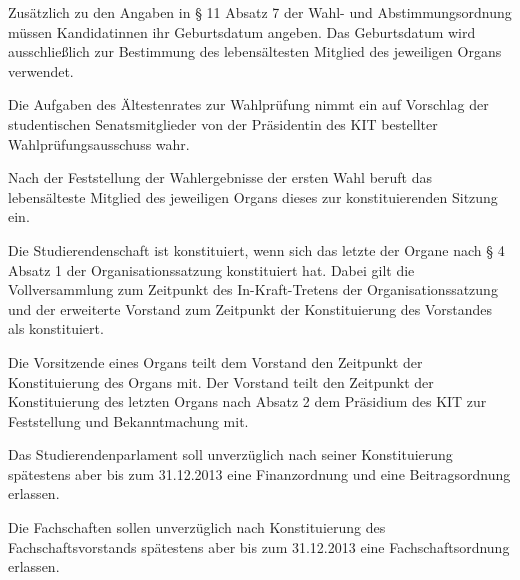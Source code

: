 Zusätzlich zu den Angaben in  § 11 Absatz 7 der Wahl- und Abstimmungsordnung müssen Kandidatinnen ihr Geburtsdatum angeben. Das Geburtsdatum wird ausschließlich zur Bestimmung des lebensältesten Mitglied des jeweiligen Organs verwendet.

Die Aufgaben des Ältestenrates  zur Wahlprüfung nimmt ein auf Vorschlag der studentischen Senatsmitglieder von der Präsidentin des KIT bestellter Wahlprüfungsausschuss wahr.


\label{konstituierung}

Nach der Feststellung der Wahlergebnisse der ersten Wahl beruft das lebensälteste Mitglied des jeweiligen Organs dieses zur konstituierenden Sitzung ein.

Die Studierendenschaft ist konstituiert, wenn sich das letzte der Organe nach § 4 Absatz 1 der Organisationssatzung konstituiert hat. Dabei gilt die Vollversammlung zum Zeitpunkt des In-Kraft-Tretens der Organisationssatzung und der erweiterte Vorstand zum Zeitpunkt der Konstituierung des Vorstandes als konstituiert.

Die Vorsitzende eines Organs teilt dem Vorstand den Zeitpunkt der Konstituierung des Organs mit. Der Vorstand teilt den Zeitpunkt der Konstituierung des letzten Organs nach Absatz 2 dem Präsidium des KIT zur Feststellung und Bekanntmachung mit.


Das Studierendenparlament soll unverzüglich nach seiner Konstituierung spätestens aber bis zum 31.12.2013 eine Finanzordnung und eine Beitragsordnung erlassen.

Die Fachschaften sollen unverzüglich nach Konstituierung des Fachschaftsvorstands spätestens aber bis zum 31.12.2013 eine Fachschaftsordnung erlassen. 

